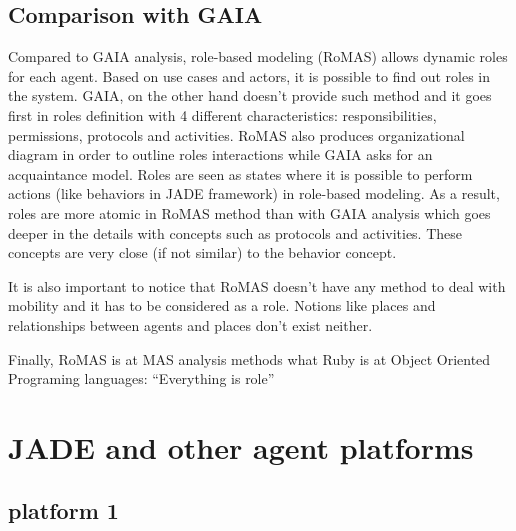 \documentclass[a4paper,11pt]{report}
\begin{document}
  \clearpage %
  
  
  \subsection{Comparison with GAIA}

  Compared to GAIA analysis, role-based modeling (RoMAS) allows dynamic roles 
  for each agent. Based on use cases and actors, it is possible to find out 
  roles in the system. GAIA, on the other hand doesn't provide such method and 
  it goes first in roles definition with 4 different characteristics: responsibilities, 
  permissions, protocols and activities. RoMAS also produces organizational 
  diagram in order to outline roles interactions while GAIA asks for an acquaintance 
  model. Roles are seen as states where it is possible to perform actions (like 
  behaviors in JADE framework) in role-based modeling. As a result, roles are more 
  atomic in RoMAS method than with GAIA analysis which goes deeper in the details with 
  concepts such as protocols and activities. These concepts are very close (if not 
  similar) to the behavior concept.
  
  It is also important to notice that RoMAS doesn't have any method to deal with mobility 
  and it has to be considered as a role. Notions like places and relationships between 
  agents and places don't exist neither.
  
  Finally, RoMAS is at MAS analysis methods what Ruby is at Object Oriented Programing 
  languages: ``Everything is role''
  
  
  \section{JADE and other agent platforms} %
  
  
  \subsection{platform 1} %
  
\end{document}
